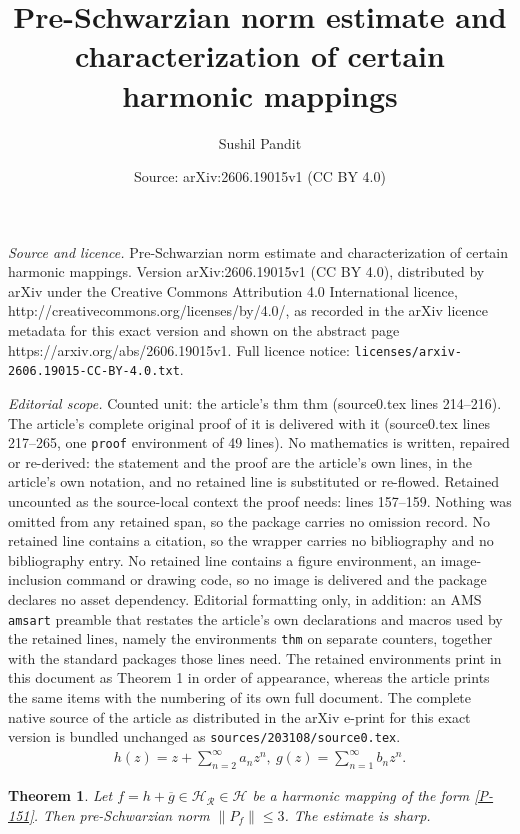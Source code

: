 \documentclass[10pt,a4paper]{amsart}
\title{Pre-Schwarzian norm estimate and characterization of certain harmonic mappings}
\author{Sushil Pandit}
\date{Source: arXiv:2606.19015v1 (CC BY 4.0)}
\newtheorem{thm}{Theorem}
\begin{document}
\maketitle

\noindent\emph{Source and licence.} Pre-Schwarzian norm estimate and characterization of certain harmonic mappings. Version arXiv:2606.19015v1 (CC BY 4.0), distributed by arXiv under the Creative Commons Attribution 4.0 International licence, http://creativecommons.org/licenses/by/4.0/, as recorded in the arXiv licence metadata for this exact version and shown on the abstract page https://arxiv.org/abs/2606.19015v1. Full licence notice: \texttt{licenses/arxiv-2606.19015-CC-BY-4.0.txt}.\par\smallskip

\noindent\textit{Editorial scope.} Counted unit: the article's thm thm (source0.tex lines 214--216). The article's complete original proof of it is delivered with it (source0.tex lines 217--265, one \texttt{proof} environment of 49 lines). No mathematics is written, repaired or re-derived: the statement and the proof are the article's own lines, in the article's own notation, and no retained line is substituted or re-flowed.  Retained uncounted as the source-local context the proof needs: lines 157--159.  Nothing was omitted from any retained span, so the package carries no omission record.  No retained line contains a citation, so the wrapper carries no bibliography and no bibliography entry.  No retained line contains a figure environment, an image-inclusion command or drawing code, so no image is delivered and the package declares no asset dependency.  Editorial formatting only, in addition: an AMS \texttt{amsart} preamble that restates the article's own declarations and macros used by the retained lines, namely the environments \texttt{thm} on separate counters, together with the standard packages those lines need.  The retained environments print in this document as Theorem 1 in order of appearance, whereas the article prints the same items with the numbering of its own full document.  The complete native source of the article as distributed in the arXiv e-print for this exact version is bundled unchanged as \texttt{sources/203108/source0.tex}.
    \begin{align}\label{P-151}
		h(z)=z+\sum\limits_{n=2}^\infty a_nz^n,~g(z)=\sum\limits_{n=1}^\infty b_nz^n.
	\end{align}

	\begin{thm}
		Let $f=h+\overline{g}\in\mathcal{H_R}\in\mathcal{H}$ be a harmonic mapping of the form \eqref{P-151}. Then pre-Schwarzian norm $\|P_f\|\le 3$. The estimate is sharp. 
	\end{thm}
\end{document}

